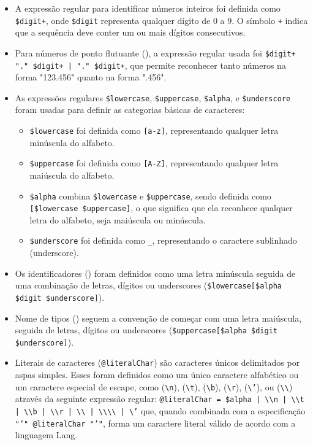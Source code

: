 \documentclass{article}
\begin{document}
\begin{itemize}
    \item A expressão regular para identificar números inteiros \texttt{\@integer} foi definida como \texttt{\$digit+}, onde \texttt{\$digit} representa qualquer dígito de 0 a 9. O símbolo \texttt{+} indica que a sequência deve conter um ou mais dígitos consecutivos.
    \item Para números de ponto flutuante (\texttt{\@float}), a expressão regular usada foi \texttt{\$digit+ "." \$digit+ | "." \$digit+}, que permite reconhecer tanto números na forma "123.456" quanto na forma ".456".
    \item As expressões regulares \texttt{\$lowercase}, \texttt{\$uppercase}, \texttt{\$alpha}, e \texttt{\$underscore} foram usadas para definir as categorias básicas de caracteres:
    \begin{itemize}
        \item \texttt{\$lowercase} foi definida como \texttt{[a-z]}, representando qualquer letra minúscula do alfabeto.
        \item \texttt{\$uppercase} foi definida como \texttt{[A-Z]}, representando qualquer letra maiúscula do alfabeto.
        \item \texttt{\$alpha} combina \texttt{\$lowercase} e \texttt{\$uppercase}, sendo definida como \texttt{[\$lowercase \$uppercase]}, o que significa que ela reconhece qualquer letra do alfabeto, seja maiúscula ou minúscula.
        \item \texttt{\$underscore} foi definida como \texttt{\_}, representando o caractere sublinhado (underscore).
    \end{itemize}
    \item Os identificadores (\texttt{\@identifier}) foram definidos como uma letra minúscula seguida de uma combinação de letras, dígitos ou underscores (\texttt{\$lowercase[\$alpha \$digit \$underscore]}).
    \item Nome de tipos (\texttt{\@typename}) seguem a convenção de começar com uma letra maiúscula, seguida de letras, dígitos ou underscores (\texttt{\$uppercase[\$alpha \$digit \$underscore]}).
    \item Literais de caracteres (\texttt{@literalChar}) são caracteres únicos delimitados por aspas simples. Esses foram definidos como um único caractere alfabético ou um caractere especial de escape, como (\texttt{\textbackslash n}), (\texttt{\textbackslash t}), (\texttt{\textbackslash b}), (\texttt{\textbackslash r}), (\texttt{\textbackslash '}), ou (\texttt{\textbackslash\textbackslash}) através da seguinte expressão regular: \texttt{@literalChar = \$alpha | \textbackslash{}\textbackslash{}n | \textbackslash{}\textbackslash{}t | \textbackslash{}\textbackslash{}b | \textbackslash{}\textbackslash{}r | \textbackslash{}\textbackslash{} | \textbackslash{}\textbackslash{}\textbackslash{}\textbackslash{} | \textbackslash{}'} que, quando combinada com a especificação \texttt{"'" @literalChar "'"}, forma um caractere literal válido de acordo com a linguagem Lang.
\end{itemize}
\end{document}
